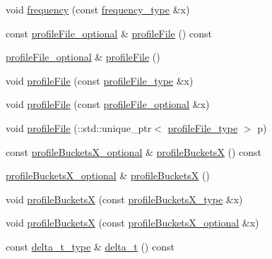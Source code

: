 \begin{DoxyCompactItemize}
\item 
void \hyperlink{classsetting__t_ad7728df734874f3205c110608b9c946c}{frequency} (const \hyperlink{classsetting__t_af0353930c8d9e0e19ee57943f2d130ee}{frequency\+\_\+type} \&x)
\item 
const \hyperlink{classsetting__t_a9fc7a23427369cf0af6e4521b9e88d64}{profile\+File\+\_\+optional} \& \hyperlink{classsetting__t_a0200d481f3304ad41e1a0d6aa51418d5}{profile\+File} () const 
\item 
\hyperlink{classsetting__t_a9fc7a23427369cf0af6e4521b9e88d64}{profile\+File\+\_\+optional} \& \hyperlink{classsetting__t_a500201a8d26ef4fc525cdd9867c08a28}{profile\+File} ()
\item 
void \hyperlink{classsetting__t_a3b265ab953b7c15607fee38c72348ff3}{profile\+File} (const \hyperlink{classsetting__t_afaef422486c04366dea99f1c838feb59}{profile\+File\+\_\+type} \&x)
\item 
void \hyperlink{classsetting__t_a8cff5d85c6321d8bd0abfd63ae3fa494}{profile\+File} (const \hyperlink{classsetting__t_a9fc7a23427369cf0af6e4521b9e88d64}{profile\+File\+\_\+optional} \&x)
\item 
void \hyperlink{classsetting__t_a358d4bf93ff7c4251b78e80fe5050d96}{profile\+File} (\+::std\+::unique\+\_\+ptr$<$ \hyperlink{classsetting__t_afaef422486c04366dea99f1c838feb59}{profile\+File\+\_\+type} $>$ p)
\item 
const \hyperlink{classsetting__t_abe44e9ac5bfb035f396dc36d8a9831d6}{profile\+Buckets\+X\+\_\+optional} \& \hyperlink{classsetting__t_aa13fb8fec5e42746f06e99d8805238bd}{profile\+BucketsX} () const 
\item 
\hyperlink{classsetting__t_abe44e9ac5bfb035f396dc36d8a9831d6}{profile\+Buckets\+X\+\_\+optional} \& \hyperlink{classsetting__t_a8dbad58d6aa2181400d9febe267560b1}{profile\+BucketsX} ()
\item 
void \hyperlink{classsetting__t_a5c71ace2fe9ba952c46aa6b97c24de20}{profile\+BucketsX} (const \hyperlink{classsetting__t_a424aba4ecbd3f03a202ef656303091a3}{profile\+Buckets\+X\+\_\+type} \&x)
\item 
void \hyperlink{classsetting__t_a87a002eda16d7b3a48d7720560bbc5c4}{profile\+BucketsX} (const \hyperlink{classsetting__t_abe44e9ac5bfb035f396dc36d8a9831d6}{profile\+Buckets\+X\+\_\+optional} \&x)
\item 
const \hyperlink{classsetting__t_ad2336c5ecdc0977272ba8126243d7977}{delta\+\_\+t\+\_\+type} \& \hyperlink{classsetting__t_a798cc1ec9957e6d50840215d04ecdca9}{delta\+\_\+t} () const 
\item 

\end{DoxyCompactItemize}
